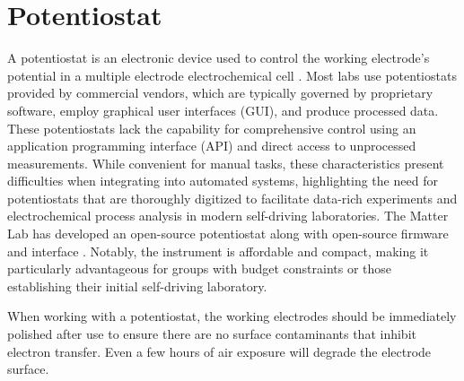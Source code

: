 \section{Potentiostat}
A potentiostat is an electronic device used to control the working electrode's potential in a multiple electrode electrochemical cell \cite{J2002-fn}. Most labs use potentiostats provided by commercial vendors, which are typically governed by proprietary software, employ graphical user interfaces (GUI), and produce processed data. These potentiostats lack the capability for comprehensive control using an application programming interface (API) and direct access to unprocessed measurements. While convenient for manual tasks, these characteristics present difficulties when integrating into automated systems, highlighting the need for potentiostats that are thoroughly digitized to facilitate data-rich experiments and electrochemical process analysis in modern self-driving laboratories. The Matter Lab has developed an open-source potentiostat along with open-source firmware and interface \cite{PabloGarca2024}. Notably, the instrument is affordable and compact, making it particularly advantageous for groups with budget constraints or those establishing their initial self-driving laboratory.  

When working with a potentiostat, the working electrodes should be immediately polished after use to ensure there are no surface contaminants that inhibit electron transfer. Even a few hours of air exposure will degrade the electrode surface. 

